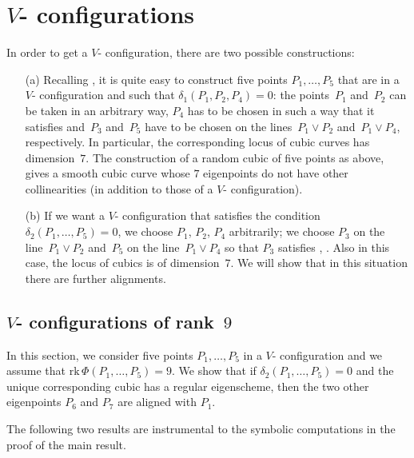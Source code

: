 \documentclass[a4paper, 11pt, reqno]{amsart}
\theoremstyle{plain}
\theoremstyle{definition}
\newcommand{\rk}{\ensuremath{\mathrm{rk}}}
\begin{document}
\section{\texorpdfstring{$V$}{V}- configurations}
\label{V-configurations}

In order to get a $V$- configuration, there are two possible constructions:
%
\begin{itemize}
    \item[(a)] Recalling , it is quite easy to construct five points $P_1, \dots, P_5$ that are in a $V$- configuration
and such that $\delta_1(P_1, P_2, P_4)= 0$: the points~$P_1$
and~$P_2$ can be taken in an arbitrary way, $P_4$ has to be chosen in such
a way that it satisfies 
and~$P_3$ and~$P_5$ have to be chosen on the lines~$P_1 \vee P_2$ and~$P_1 \vee P_4$,
respectively. In particular, the corresponding locus of cubic curves
has dimension~$7$.
The construction of a random cubic
of five points as above, gives a smooth cubic curve whose $7$ eigenpoints
do not have other collinearities (in addition to those of a
$V$- configuration).
    \item[(b)] If we want a $V$- configuration that satisfies the condition
$\delta_2(P_1, \dots, P_5) = 0$, we choose $P_1$, $P_2$, $P_4$ arbitrarily;
we choose $P_3$ on the line~$P_1 \vee P_2$ and~$P_5$ on the line~$P_1 \vee P_4$ so that $P_3$ satisfies , .
Also in this case, the locus of cubics is of dimension~$7$.
We will show that in this situation there are further alignments.
\end{itemize}

\subsection{\texorpdfstring{$V$}{V}- configurations of rank~\texorpdfstring{$9$}{9}}
\label{rank_9}

In this section, we consider five points $P_1, \dots, P_5$ in a $V$- configuration and we assume that $\rk \, \Phi(P_1, \dots, P_5) = 9$.
We show that if $\delta_2(P_1, \dotsc, P_5) = 0$ and the unique corresponding cubic has a regular eigenscheme, then the two other eigenpoints $P_6$ and $P_7$ are aligned with $P_1$.

The following two results are instrumental to the symbolic computations in the proof of the main result.
\end{document}
